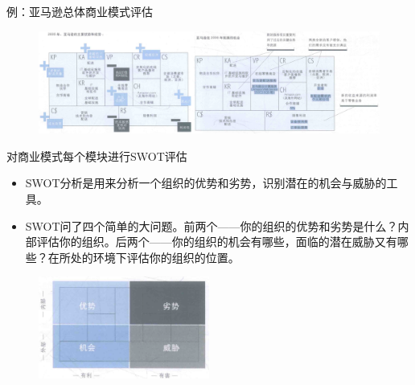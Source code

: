 例：亚马逊总体商业模式评估
\begin{figure}[H]
	\centering
	\vspace{-0.5em}
	\includegraphics[width=\textwidth]{img/亚马逊总体商业模式评估.png}
    \vspace{-0.5em}
\end{figure}

对商业模式每个模块进行SWOT评估
\begin{itemize}
    \item SWOT分析是用来分析一个组织的优势和劣势，识别潜在的机会与威胁的工具。
    \item  SWOT问了四个简单的大问题。前两个——你的组织的优势和劣势是什么？内部评估你的组织。后两个——你的组织的机会有哪些，面临的潜在威胁又有哪些？在所处的环境下评估你的组织的位置。
\end{itemize}
\begin{figure}[H]
	\centering
	\vspace{-0.5em}
	\includegraphics[width=0.5\textwidth]{img/SWOT评估.png}
    \vspace{-0.5em}
\end{figure}

